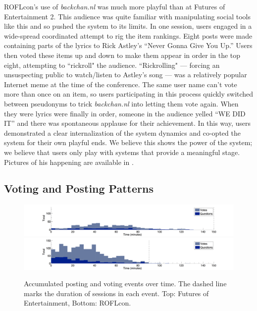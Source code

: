 ROFLcon's use of \emph{backchan.nl} was much more playful than at Futures of Entertainment 2. This audience was quite familiar with manipulating social tools like this and so pushed the system to its limits. In one session, users engaged in a wide-spread coordinated attempt to rig the item rankings. Eight posts were made containing parts of the lyrics to Rick Astley's ``Never Gonna Give You Up.'' \citep{Anonymous:2007ti} Users then voted these items up and down to make them appear in order in the top eight, attempting to ``rickroll" the audience. ``Rickrolling" — forcing an unsuspecting public to watch/listen to Astley's song — was a relatively popular Internet meme at the time of the conference. The same user name can't vote more than once on an item, so users participating in this process quickly switched between pseudonyms to trick \emph{backchan.nl} into letting them vote again. When they were lyrics were finally in order, someone in the audience yelled ``WE DID IT'' and there was spontaneous applause for their achievement. In this way, users demonstrated a clear internalization of the system dynamics and co-opted the system for their own playful ends. We believe this shows the power of the system; we believe that users only play with systems that provide a meaningful stage. Pictures of his happening are available in \citep{Chillag:2008wr}.

\subsection{Voting and Posting Patterns}

\begin{figure}[t]
	\includegraphics{figures/backchannl/foe2_posting_history.png}
	\includegraphics{figures/backchannl/roflcon_figure.png}

	\caption{Accumulated posting and voting events over time. The dashed line marks the duration of sessions in each event. Top: Futures of Entertainment, Bottom: ROFLcon.}
	\label{fig:posting_time_patterns}
\end{figure}

